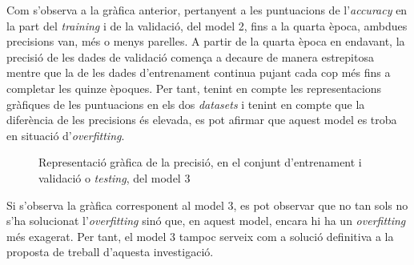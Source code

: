 \documentclass[a4paper,12pt]{report}
\begin{document}
Com s'observa a la gràfica anterior, pertanyent a les puntuacions de l'\textit{accuracy} en la part del \textit{training} i de la validació, del model 2, fins a la quarta època, ambdues precisions van, més o menys parelles. A partir de la quarta època en endavant, la precisió de les dades de validació comença a decaure de manera estrepitosa mentre que la de les dades d'entrenament continua pujant cada cop més fins a completar les quinze èpoques. Per tant, tenint en compte les representacions gràfiques de les puntuacions en els dos \textit{datasets} i tenint en compte que la diferència de les precisions és elevada, es pot afirmar que aquest model es troba en situació d'\textit{overfitting}.
\begin{figure}[H]
    \centering
    \caption{Representació gràfica de la precisió, en el conjunt d'entrenament i validació o \textit{testing}, del model 3}
    \label{fig:model3}
\end{figure}
Si s'observa la gràfica corresponent al model 3, es pot observar que no tan sols no s'ha solucionat l'\textit{overfitting} sinó que, en aquest model, encara hi ha un \textit{overfitting} més exagerat. Per tant, el model 3 tampoc serveix com a solució definitiva a la proposta de treball d'aquesta investigació.
\end{document}
